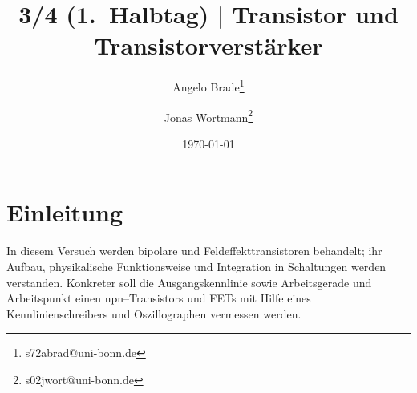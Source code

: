 \documentclass[a4paper,10pt]{article}
\numberwithin{equation}{section}
\begin{document}

\begin{titlepage}
        \title{3/4 (1.\ Halbtag) $|$ Transistor und Transistorverstärker}
        \author[1]{Angelo Brade\thanks{s72abrad@uni-bonn.de}}
        \author[1]{Jonas Wortmann\thanks{s02jwort@uni-bonn.de}}
        \date{\today}
\end{titlepage}

\maketitle
{}


\newpage


\fancyhead[R]{\thepage}
\fancyfoot[C]{}

\tableofcontents


\newpage


\fancyhead[R]{\leftmark}

\section{Einleitung}
In diesem Versuch werden bipolare und Feldeffekttransistoren behandelt; ihr Aufbau, physikalische Funktionsweise und Integration in Schaltungen werden verstanden.
Konkreter soll die Ausgangskennlinie sowie Arbeitsgerade und Arbeitspunkt einen npn--Transistors und FETs mit Hilfe eines Kennlinienschreibers und Oszillographen vermessen werden.
\end{document}
